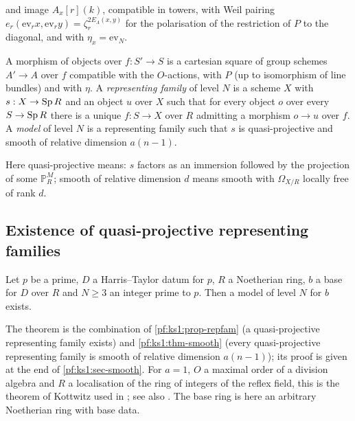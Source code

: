 \begin{definition}
\begin{enumerate}[label=(O\arabic*)]
  and image $A_x[r](k)$, compatible in towers, with Weil pairing $e_r(\mathrm{ev}_rx,\mathrm{ev}_ry)=
  \zeta_r^{2E_\Lambda(x,y)}$ for the polarisation of the restriction of $P$ to the diagonal, and with
  $\eta_x=\mathrm{ev}_N$.
\end{enumerate}
A morphism of objects over $f:S'\to S$ is a cartesian square of group schemes $A'\to A$ over $f$
compatible with the $O$-actions, with $P$ (up to isomorphism of line bundles) and with $\eta$. A
\emph{representing family} of level $N$ is a scheme $X$ with $s:X\to\operatorname{Sp} R$ and an object $u$ over $X$
such that for every object $o$ over every $S\to\operatorname{Sp} R$ there is a unique $f:S\to X$ over $R$ admitting a
morphism $o\to u$ over $f$. A \emph{model} of level $N$ is a representing family such that $s$ is
quasi-projective and smooth of relative dimension $a(n-1)$.
\end{definition}

Here quasi-projective means: $s$ factors as an immersion followed by the projection of some
$\mathbb P^M_R$; smooth of relative dimension $d$ means smooth with $\Omega_{X/R}$ locally free of rank $d$.

\subsection{Existence of quasi-projective representing families}\label{pf:ks1:sec-rep}

\begin{theorem}\label{pf:ks1:thm-models}
Let $p$ be a prime, $D$ a Harris--Taylor datum for $p$, $R$ a Noetherian ring, $b$ a base for $D$ over $R$
and $N\ge3$ an integer prime to $p$. Then a model of level $N$ for $b$ exists.
\end{theorem}

The theorem is the combination of \cref{pf:ks1:prop-repfam} (a quasi-projective representing family
exists) and \cref{pf:ks1:thm-smooth} (every quasi-projective representing family is smooth of relative
dimension $a(n-1)$); its proof is given at the end of \cref{pf:ks1:sec-smooth}. For $a=1$, $O$ a maximal
order of a division algebra and $R$ a localisation of the ring of integers of the reflex field, this is
the theorem of Kottwitz \cite[\S5]{Kottwitz1992} used in \cite[Ch.~III]{HarrisTaylor2001}; see also
\cite[Ch.~1--2]{Lan2013}. The base ring is here an arbitrary Noetherian ring with base data.

